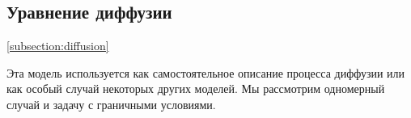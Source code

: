 \documentclass[a4paper, 12pt]{article}
\begin{document}




\subsection{Уравнение диффузии} \ref{subsection:diffusion}

Эта модель используется как самостоятельное описание процесса диффузии или как особый случай некоторых других моделей. Мы рассмотрим одномерный случай и задачу с граничными условиями.
\end{document}
